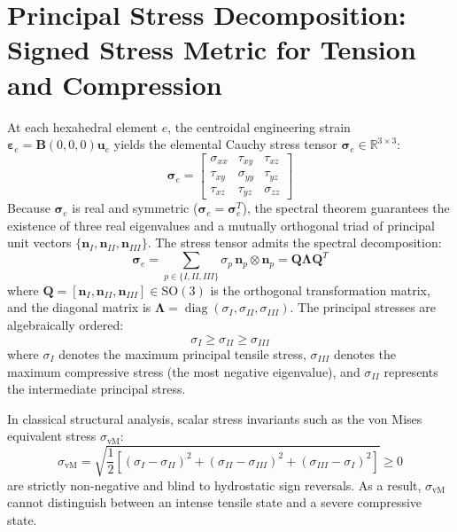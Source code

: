 \documentclass[11pt, a4paper]{article}
\begin{document}
\section{Principal Stress Decomposition: Signed Stress Metric for Tension and Compression}
At each hexahedral element $e$, the centroidal engineering strain $\boldsymbol{\varepsilon}_e = \mathbf{B}(0,0,0) \mathbf{u}_e$ yields the elemental Cauchy stress tensor $\boldsymbol{\sigma}_e \in \mathbb{R}^{3 \times 3}$:
\begin{equation}
\boldsymbol{\sigma}_e = \begin{bmatrix}
\sigma_{xx} & \tau_{xy} & \tau_{xz} \\
\tau_{xy} & \sigma_{yy} & \tau_{yz} \\
\tau_{xz} & \tau_{yz} & \sigma_{zz}
\end{bmatrix}
\end{equation}
Because $\boldsymbol{\sigma}_e$ is real and symmetric ($\boldsymbol{\sigma}_e = \boldsymbol{\sigma}_e^T$), the spectral theorem guarantees the existence of three real eigenvalues and a mutually orthogonal triad of principal unit vectors $\{\mathbf{n}_I, \mathbf{n}_{II}, \mathbf{n}_{III}\}$. The stress tensor admits the spectral decomposition:
\begin{equation}
\boldsymbol{\sigma}_e = \sum_{p \in \{I, II, III\}} \sigma_p \, \mathbf{n}_p \otimes \mathbf{n}_p = \mathbf{Q} \boldsymbol{\Lambda} \mathbf{Q}^T
\end{equation}
where $\mathbf{Q} = [\mathbf{n}_I, \mathbf{n}_{II}, \mathbf{n}_{III}] \in \mathrm{SO}(3)$ is the orthogonal transformation matrix, and the diagonal matrix is $\boldsymbol{\Lambda} = \operatorname{diag}(\sigma_I, \sigma_{II}, \sigma_{III})$. The principal stresses are algebraically ordered:
\begin{equation}
\sigma_I \ge \sigma_{II} \ge \sigma_{III}
\end{equation}
where $\sigma_I$ denotes the maximum principal tensile stress, $\sigma_{III}$ denotes the maximum compressive stress (the most negative eigenvalue), and $\sigma_{II}$ represents the intermediate principal stress.

In classical structural analysis, scalar stress invariants such as the von Mises equivalent stress $\sigma_{\text{vM}}$:
\begin{equation}
\sigma_{\text{vM}} = \sqrt{\frac{1}{2} \left[ (\sigma_I - \sigma_{II})^2 + (\sigma_{II} - \sigma_{III})^2 + (\sigma_{III} - \sigma_I)^2 \right]} \ge 0
\end{equation}
are strictly non-negative and blind to hydrostatic sign reversals. As a result, $\sigma_{\text{vM}}$ cannot distinguish between an intense tensile state and a severe compressive state.
\end{document}
